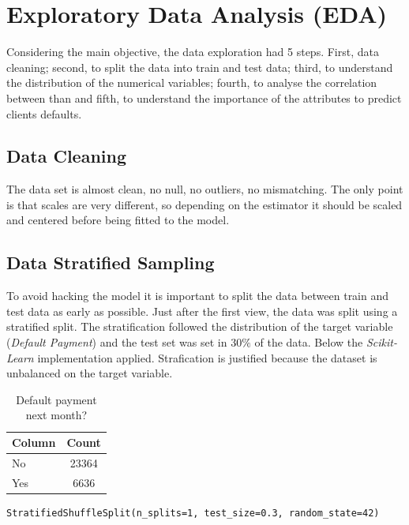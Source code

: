 \documentclass[11pt, a4]{article}
\begin{document}
\section*{Exploratory Data Analysis (EDA)}

Considering the main objective, the data exploration had 5 steps. First, data cleaning; second, to split the data into train and test data; third, to understand the distribution of the numerical variables; fourth, to analyse the correlation between than and fifth, to understand the importance of the attributes to predict clients defaults.


\subsection*{Data Cleaning}

The data set is almost clean, no null, no outliers, no mismatching. The only point is that scales are very different, so depending on the estimator it should be scaled and centered before being fitted to the model. 

\subsection*{Data Stratified Sampling}

To avoid hacking the model it is important to split the data between train and test data as early as possible. Just after the first view, the data was split using a stratified split. The stratification followed the distribution of the target variable (\textit{Default Payment}) and the test set was set in $30\%$ of the data. Below the \textit{Scikit-Learn} implementation applied. Strafication is justified because the dataset is unbalanced on the target variable.

\begin{table}[h!]
\centering
\begin{tabular}{l c }
\toprule
\textbf{Column} & \textbf{Count} \\
\midrule
No & 23364\\
Yes& 6636\\
\bottomrule
\end{tabular}
\caption{Default payment next month?}
\label{table:2}
\end{table}

\begin{lstlisting}
StratifiedShuffleSplit(n_splits=1, test_size=0.3, random_state=42)
\end{lstlisting}
\end{document}
